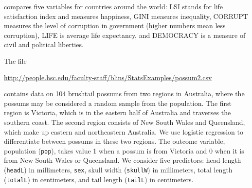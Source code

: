 \documentclass[11pt]{exam}
\begin{document}
\begin{questions}
compares five variables for countries around the world: LSI stands for life satisfaction index and measures happiness, GINI measures inequality, CORRUPT measures the level of corruption in government (higher numbers mean less corruption), LIFE is average life expectancy, and DEMOCRACY is a measure of civil and political liberties.  

\question The file 

{\small
\url{http://people.hsc.edu/faculty-staff/blins/StatsExamples/possum2.csv} 
}

contains data on 104 brushtail possums from two regions in Australia, where the possums may be considered a random sample from the population. The first region is Victoria, which is in the eastern half of
Australia and traverses the southern coast. The second region consists of New South Wales and
Queensland, which make up eastern and northeastern Australia.
We use logistic regression to differentiate between possums in these two regions. The outcome
variable, population (\verb|pop|), takes value 1 when a possum is from Victoria and 0 when it is from
New South Wales or Queensland. We consider five predictors: head length (\verb|headL|) in millimeters, \verb|sex|, skull width (\verb|skullW|) in millimeters, total length (\verb|totalL|) in centimeters, and tail length (\verb|tailL|) in centimeters.  


\end{questions}
\end{document}
